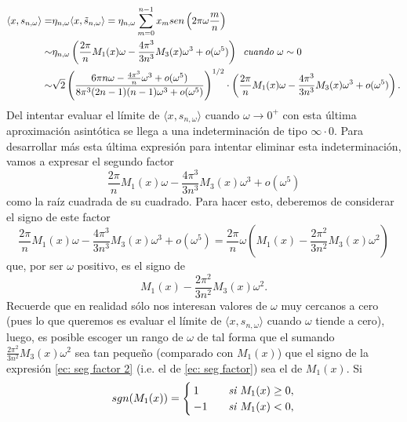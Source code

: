 \begin{align*}
\langle x,
s_{n, \omega}
\rangle =
& 
\eta_{n, \omega} \langle x,
\tilde{s}_{n, \omega}
\rangle =  
\eta_{n, \omega} \sum\limits_{m=0}^{n-1}x_{m} sen \left(
2 \pi \omega \frac{m}{n}
\right) \\
\sim &
\eta_{n, \omega}
\left(
\frac{2 \pi}{n} M_{1}(x) \omega - \frac{4 \pi^{3}}{3n^{3}}M_{3}(x) \omega^{3} 
 + o(\omega^{5})
\right)
\hspace{0.2cm}
\textit{cuando } \omega \sim 0
\\
\sim & 
\sqrt{2} 
\left(
\frac{
6 \pi n \omega -
\frac{4 \pi^{3}}{n} \omega^{3} + o(\omega^{5})
}{8 \pi^{3} (2n-1)(n-1)\omega^{3} + o(\omega^{5})
}
\right)^{1/2}
\cdot 
\left(
\frac{2 \pi}{n} M_{1}(x) \omega - \frac{4 \pi^{3}}{3n^{3}}M_{3}(x) \omega^{3} 
 + o(\omega^{5})
\right).
\end{align*}
Del intentar evaluar el límite de
$\langle x,
s_{n, \omega}
\rangle $ cuando $\omega \rightarrow 0^{+}$
con esta última aproximación asintótica se llega a una
indeterminación de tipo $\infty \cdot 0$.
Para desarrollar más esta última expresión para intentar
eliminar esta indeterminación, vamos a expresar 
el segundo factor 
\begin{equation}
\label{ec: seg factor}
\frac{2 \pi}{n} M_{1}(x) \omega - \frac{4 \pi^{3}}{3n^{3}}M_{3}(x) \omega^{3} 
 + o(\omega^{5})
\end{equation}
como la raíz cuadrada de su cuadrado.
Para hacer esto, deberemos de considerar el signo de este factor
\[
\frac{2 \pi}{n} M_{1}(x) \omega - \frac{4 \pi^{3}}{3n^{3}}M_{3}(x) \omega^{3} 
 + o(\omega^{5}) = 
 \frac{2\pi}{n} \omega \left(
 M_{1}(x) - \frac{2\pi^{2}}{3n^{2}}M_{3}(x)\omega^{2}
\right)
\]
que, por ser $\omega$ positivo, es el signo de 
\begin{equation}
\label{ec: seg factor 2}
M_{1}(x) - \frac{2\pi^{2}}{3n^{2}}M_{3}(x)\omega^{2}.
\end{equation}
Recuerde que en realidad sólo nos interesan valores de 
$\omega$ muy cercanos a cero (pues lo que queremos es evaluar
el límite de $\langle x, s_{n, \omega} \rangle$
cuando $\omega$ tiende a cero), luego, es posible escoger
un rango de $\omega$ de tal forma que el sumando 
$\frac{2\pi^{2}}{3n^{2}}M_{3}(x)\omega^{2}$ sea tan pequeño (comparado
con $M_{1}(x)$) que el signo de la expresión
\eqref{ec: seg factor 2}
(i.e. el de \eqref{ec: seg factor}) sea 
el de $M_{1}(x)$. Si
\begin{align*}
sgn(M_{1}(x))= \begin{cases}
1 & \hspace{0.2cm} \textit{ si } M_{1}(x) \geq 0, \\
-1 & \hspace{0.2cm} \textit{ si } M_{1}(x) < 0,
\end{cases}
\end{align*}

